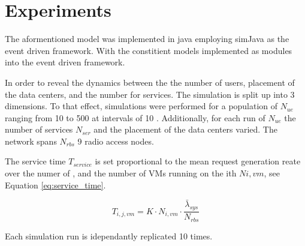 \section{Experiments}
The aformentioned model was implemented in java employing simJava \cite{SimJava} as the event driven framework. With the constitient models implemented as modules into the event driven framework.

In order to reveal the dynamics between the the number of users, placement of the data centers, and the number for services. The simulation is split up into 3 dimensions. To that effect, simulations were performed for a population of \ues $N_{ue}$ ranging from 10 to 500 \ues at intervals of 10 \ues. Additionally, for each run of $N_{ue}$ the number of services $N_{ser}$ and the placement of the data centers varied. The network spans $N_{rbs}$ 9 radio access nodes.

The \dc service time $T_{service}$ is set proportional to the mean request generation reate over the numer of  \rbss, and the number of VMs running on the ith \dc $N{i,vm}$, see Equation \ref{eq:service_time}.

\begin{equation}
\label{eq:service_time}
T_{i,j,vm} = K \cdot N_{i,vm} \cdot \frac{ \bar{\lambda}_{sys} }{N_{rbs}}
\end{equation}

Each simulation run is idependantly replicated 10 times.